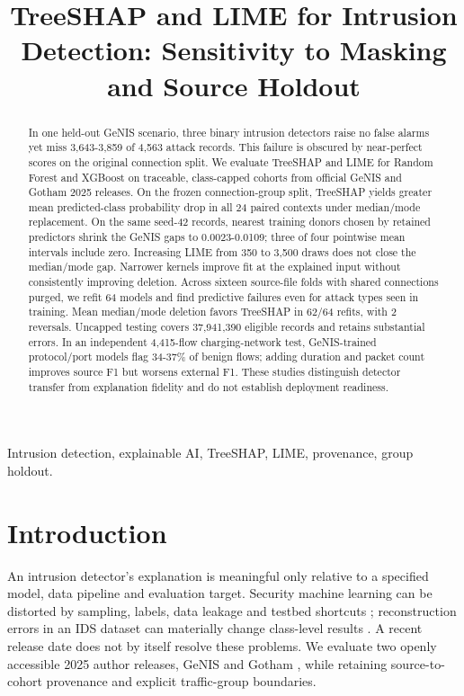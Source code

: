 \documentclass[conference,letterpaper]{IEEEtran}
\begin{document}
\title{TreeSHAP and LIME for Intrusion Detection: Sensitivity to Masking and Source Holdout}
\author{}
\maketitle
\begin{abstract}
In one held-out GeNIS scenario, three binary intrusion detectors raise no false alarms yet miss 3,643-3,859 of 4,563 attack records. This failure is obscured by near-perfect scores on the original connection split. We evaluate TreeSHAP and LIME for Random Forest and XGBoost on traceable, class-capped cohorts from official GeNIS and Gotham 2025 releases. On the frozen connection-group split, TreeSHAP yields greater mean predicted-class probability drop in all 24 paired contexts under median/mode replacement. On the same seed-42 records, nearest training donors chosen by retained predictors shrink the GeNIS gaps to 0.0023-0.0109; three of four pointwise mean intervals include zero. Increasing LIME from 350 to 3,500 draws does not close the median/mode gap. Narrower kernels improve fit at the explained input without consistently improving deletion. Across sixteen source-file folds with shared connections purged, we refit 64 models and find predictive failures even for attack types seen in training. Mean median/mode deletion favors TreeSHAP in 62/64 refits, with 2 reversals. Uncapped testing covers 37,941,390 eligible records and retains substantial errors. In an independent 4,415-flow charging-network test, GeNIS-trained protocol/port models flag 34-37\% of benign flows; adding duration and packet count improves source F1 but worsens external F1. These studies distinguish detector transfer from explanation fidelity and do not establish deployment readiness.
\end{abstract}
\begin{IEEEkeywords}Intrusion detection, explainable AI, TreeSHAP, LIME, provenance, group holdout.\end{IEEEkeywords}

\section{Introduction}
An intrusion detector's explanation is meaningful only relative to a specified model, data pipeline and evaluation target. Security machine learning can be distorted by sampling, labels, data leakage and testbed shortcuts \cite{arp}; reconstruction errors in an IDS dataset can materially change class-level results \cite{engelen}. A recent release date does not by itself resolve these problems. We evaluate two openly accessible 2025 author releases, GeNIS \cite{genis_record,genis} and Gotham \cite{gotham_record,gotham}, while retaining source-to-cohort provenance and explicit traffic-group boundaries.
\end{document}
